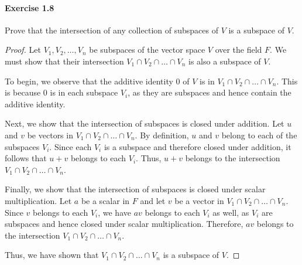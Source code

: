 \documentclass{article}
\theoremstyle{definition}
\begin{document}
\paragraph{Exercise 1.8} Prove that the intersection of any collection of subspaces of $V$ is a subspace of $V$.
\begin{proof}
Let $V_1, V_2, \ldots, V_n$ be subspaces of the vector space $V$ over the field $F$. We must show that their intersection $V_1 \cap V_2 \cap \ldots \cap V_n$ is also a subspace of $V$.

To begin, we observe that the additive identity $0$ of $V$ is in $V_1 \cap V_2 \cap \ldots \cap V_n$. This is because $0$ is in each subspace $V_i$, as they are subspaces and hence contain the additive identity.

Next, we show that the intersection of subspaces is closed under addition. Let $u$ and $v$ be vectors in $V_1 \cap V_2 \cap \ldots \cap V_n$. By definition, $u$ and $v$ belong to each of the subspaces $V_i$. Since each $V_i$ is a subspace and therefore closed under addition, it follows that $u+v$ belongs to each $V_i$. Thus, $u+v$ belongs to the intersection $V_1 \cap V_2 \cap \ldots \cap V_n$.

Finally, we show that the intersection of subspaces is closed under scalar multiplication. Let $a$ be a scalar in $F$ and let $v$ be a vector in $V_1 \cap V_2 \cap \ldots \cap V_n$. Since $v$ belongs to each $V_i$, we have $av$ belongs to each $V_i$ as well, as $V_i$ are subspaces and hence closed under scalar multiplication. Therefore, $av$ belongs to the intersection $V_1 \cap V_2 \cap \ldots \cap V_n$.

Thus, we have shown that $V_1 \cap V_2 \cap \ldots \cap V_n$ is a subspace of $V$.
\end{proof}
\end{document}
